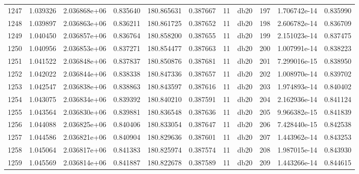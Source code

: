 \begin{tabular}{lrrrrrrlrrr}
1247 &    1.039326 &        2.036868e+06 &  0.835640 &              180.865631 &    0.387667 &      11 &         db20 &    197 &   1.706742e-14 &      0.835990 \\
1248 &    1.039897 &        2.036863e+06 &  0.836211 &              180.861725 &    0.387652 &      11 &         db20 &    198 &   2.606782e-14 &      0.836709 \\
1249 &    1.040450 &        2.036857e+06 &  0.836764 &              180.858200 &    0.387655 &      11 &         db20 &    199 &   2.151023e-14 &      0.837475 \\
1250 &    1.040956 &        2.036853e+06 &  0.837271 &              180.854477 &    0.387663 &      11 &         db20 &    200 &   1.007991e-14 &      0.838223 \\
1251 &    1.041522 &        2.036848e+06 &  0.837837 &              180.850876 &    0.387681 &      11 &         db20 &    201 &   7.299016e-15 &      0.838950 \\
1252 &    1.042022 &        2.036844e+06 &  0.838338 &              180.847336 &    0.387657 &      11 &         db20 &    202 &   1.008970e-14 &      0.839702 \\
1253 &    1.042547 &        2.036838e+06 &  0.838863 &              180.843597 &    0.387616 &      11 &         db20 &    203 &   1.974893e-14 &      0.840402 \\
1254 &    1.043075 &        2.036834e+06 &  0.839392 &              180.840210 &    0.387591 &      11 &         db20 &    204 &   2.162936e-14 &      0.841124 \\
1255 &    1.043564 &        2.036830e+06 &  0.839881 &              180.836548 &    0.387636 &      11 &         db20 &    205 &   9.966382e-15 &      0.841839 \\
1256 &    1.044088 &        2.036825e+06 &  0.840406 &              180.833054 &    0.387647 &      11 &         db20 &    206 &   7.428440e-15 &      0.842538 \\
1257 &    1.044586 &        2.036821e+06 &  0.840904 &              180.829636 &    0.387601 &      11 &         db20 &    207 &   1.443962e-14 &      0.843253 \\
1258 &    1.045064 &        2.036817e+06 &  0.841383 &              180.825974 &    0.387574 &      11 &         db20 &    208 &   1.987015e-14 &      0.843930 \\
1259 &    1.045569 &        2.036814e+06 &  0.841887 &              180.822678 &    0.387589 &      11 &         db20 &    209 &   1.443266e-14 &      0.844615 \\

\end{tabular}
